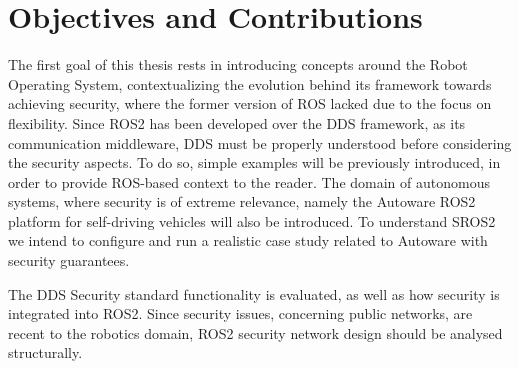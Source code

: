 


\section{Objectives and Contributions}

The first goal of this thesis rests in introducing concepts around the Robot Operating System, contextualizing the evolution behind its framework towards achieving security, where the former version of ROS lacked due to the focus on flexibility. Since ROS2 has been developed over the DDS framework, as its communication middleware, DDS must be properly understood before considering the security aspects. To do so, simple examples will be previously introduced, in order to provide ROS-based context to the reader. The domain of autonomous systems, where security is of extreme relevance, namely the Autoware \cite{8443742} ROS2 platform for self-driving vehicles will also be introduced. To understand SROS2 we intend to configure and run a realistic case study related to Autoware with security guarantees. 

The DDS Security standard functionality is evaluated, as well as how security is integrated into ROS2. Since security issues, concerning public networks, are recent to the robotics domain, ROS2 security network design should be analysed structurally.

